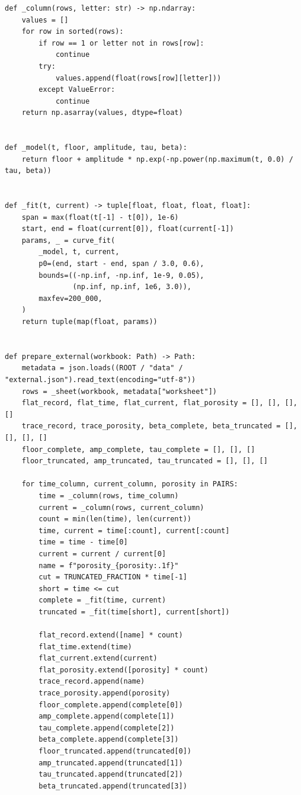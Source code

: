\documentclass[a4paper,10pt]{article}
\begin{document}
\begin{Verbatim}
def _column(rows, letter: str) -> np.ndarray:
    values = []
    for row in sorted(rows):
        if row == 1 or letter not in rows[row]:
            continue
        try:
            values.append(float(rows[row][letter]))
        except ValueError:
            continue
    return np.asarray(values, dtype=float)


def _model(t, floor, amplitude, tau, beta):
    return floor + amplitude * np.exp(-np.power(np.maximum(t, 0.0) / tau, beta))


def _fit(t, current) -> tuple[float, float, float, float]:
    span = max(float(t[-1] - t[0]), 1e-6)
    start, end = float(current[0]), float(current[-1])
    params, _ = curve_fit(
        _model, t, current,
        p0=(end, start - end, span / 3.0, 0.6),
        bounds=((-np.inf, -np.inf, 1e-9, 0.05),
                (np.inf, np.inf, 1e6, 3.0)),
        maxfev=200_000,
    )
    return tuple(map(float, params))


def prepare_external(workbook: Path) -> Path:
    metadata = json.loads((ROOT / "data" / "external.json").read_text(encoding="utf-8"))
    rows = _sheet(workbook, metadata["worksheet"])
    flat_record, flat_time, flat_current, flat_porosity = [], [], [], []
    trace_record, trace_porosity, beta_complete, beta_truncated = [], [], [], []
    floor_complete, amp_complete, tau_complete = [], [], []
    floor_truncated, amp_truncated, tau_truncated = [], [], []

    for time_column, current_column, porosity in PAIRS:
        time = _column(rows, time_column)
        current = _column(rows, current_column)
        count = min(len(time), len(current))
        time, current = time[:count], current[:count]
        time = time - time[0]
        current = current / current[0]
        name = f"porosity_{porosity:.1f}"
        cut = TRUNCATED_FRACTION * time[-1]
        short = time <= cut
        complete = _fit(time, current)
        truncated = _fit(time[short], current[short])

        flat_record.extend([name] * count)
        flat_time.extend(time)
        flat_current.extend(current)
        flat_porosity.extend([porosity] * count)
        trace_record.append(name)
        trace_porosity.append(porosity)
        floor_complete.append(complete[0])
        amp_complete.append(complete[1])
        tau_complete.append(complete[2])
        beta_complete.append(complete[3])
        floor_truncated.append(truncated[0])
        amp_truncated.append(truncated[1])
        tau_truncated.append(truncated[2])
        beta_truncated.append(truncated[3])


\end{Verbatim}
\end{document}
